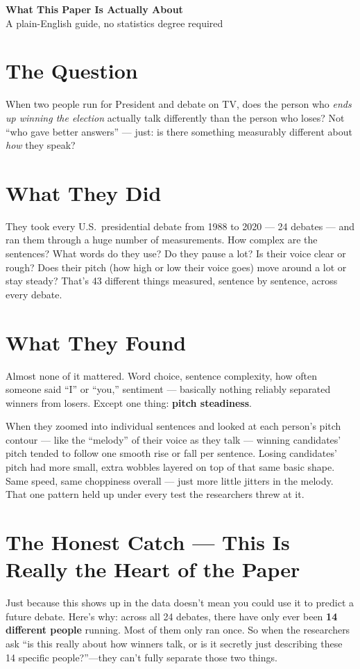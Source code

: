 \documentclass[11pt]{article}
\begin{document}
\begin{center}
{\Huge\bfseries\color{ink} What This Paper Is Actually About}\\[0.4em]
{\large\color{sec} A plain-English guide, no statistics degree required}
\end{center}

\vspace{1em}

\section*{The Question}
When two people run for President and debate on TV, does the person who
\emph{ends up winning the election} actually talk differently than the
person who loses? Not ``who gave better answers'' --- just: is there
something measurably different about \emph{how} they speak?

\section*{What They Did}
They took every U.S.\ presidential debate from 1988 to 2020 --- 24 debates
--- and ran them through a huge number of measurements. How complex are
the sentences? What words do they use? Do they pause a lot? Is their voice
clear or rough? Does their pitch (how high or low their voice goes) move
around a lot or stay steady? That's 43 different things measured, sentence
by sentence, across every debate.

\section*{What They Found}
Almost none of it mattered. Word choice, sentence complexity, how often
someone said ``I'' or ``you,'' sentiment --- basically nothing reliably
separated winners from losers. Except one thing: \textbf{pitch steadiness}.

When they zoomed into individual sentences and looked at each person's
pitch contour --- like the ``melody'' of their voice as they talk ---
winning candidates' pitch tended to follow one smooth rise or fall per
sentence. Losing candidates' pitch had more small, extra wobbles layered
on top of that same basic shape. Same speed, same choppiness overall ---
just more little jitters in the melody. That one pattern held up under
every test the researchers threw at it.

\section*{The Honest Catch --- This Is Really the Heart of the Paper}
Just because this shows up in the data doesn't mean you could use it to
predict a future debate. Here's why: across all 24 debates, there have
only ever been \textbf{14 different people} running. Most of them only ran
once. So when the researchers ask ``is this really about how winners
talk, or is it secretly just describing these 14 specific people?''---they
can't fully separate those two things.
\end{document}
